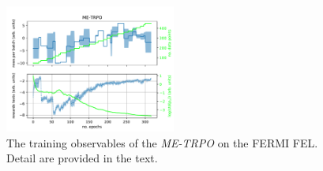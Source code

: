\documentclass[
reprint,nofootinbib,
amsmath,amssymb,amsfonts,clevref,
aps,
prstab,
]{revtex4-2}
\begin{document}
	
	\begin{figure}
		\centering
		\includegraphics*[width=0.5\textwidth]{Figures/ME-TRPO_observables.pdf}
		\caption{The training observables of the \emph{ME-TRPO} on the FERMI FEL. Detail are provided in the text.}
		\label{fig:ME-TRPO_observables}
	\end{figure}
	
\end{document}
